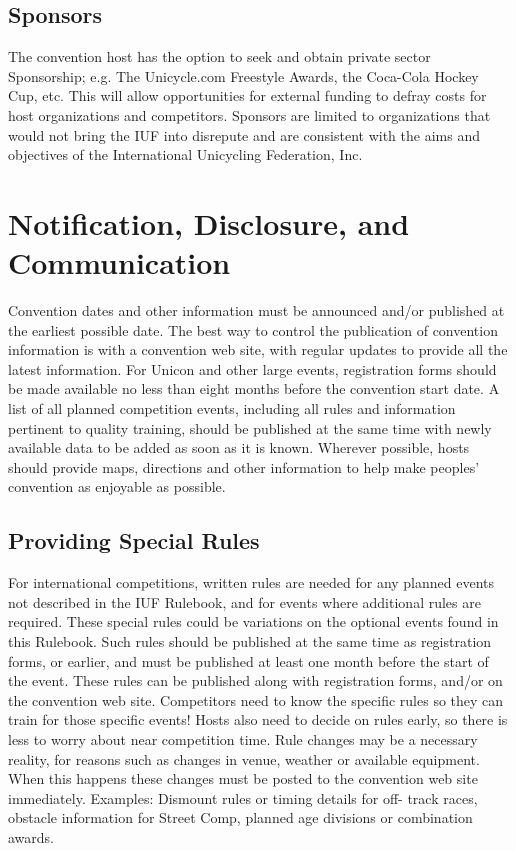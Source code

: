 \subsection{Sponsors}
The convention host has the option to seek and obtain private sector Sponsorship; e.g. The Unicycle.com Freestyle Awards, the Coca-Cola Hockey Cup, etc. 
This will allow opportunities for external funding to defray costs for host organizations and competitors. 
Sponsors are limited to organizations that would not bring the IUF into disrepute and are consistent with the aims and objectives of the International Unicycling Federation, Inc.

\section{Notification, Disclosure, and Communication}
Convention dates and other information must be announced and/or published at the earliest possible date. 
The best way to control the publication of convention information is with a convention web site, with regular updates to provide all the latest information. 
For Unicon and other large events, registration forms should be made available no less than eight months before the convention start date. 
A list of all planned competition events, including all rules and information pertinent to quality training, should be published at the same time with newly available data to be added as soon as it is known. 
Wherever possible, hosts should provide maps, directions and other information to help make peoples' convention as enjoyable as possible.

\subsection{Providing Special Rules}
For international competitions, written rules are needed for any planned events not described in the IUF Rulebook, and for events where additional rules are required. 
These special rules could be variations on the optional events found in this Rulebook. 
Such rules should be published at the same time as registration forms, or earlier, and must be published at least one month before the start of the event. 
These rules can be published along with registration forms, and/or on the convention web site. 
Competitors need to know the specific rules so they can train for those specific events! 
Hosts also need to decide on rules early, so there is less to worry about near competition time. 
Rule changes may be a necessary reality, for reasons such as changes in venue, weather or available equipment. 
When this happens these changes must be posted to the convention web site immediately. 
Examples: Dismount rules or timing details for off- track races, obstacle information for Street Comp, planned age divisions or combination awards.

